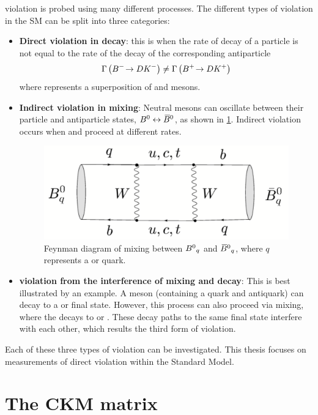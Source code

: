 \CP violation is probed using many different processes. The different types of \CP violation in the SM can be split into three categories:
\begin{itemize}
\item \textbf{Direct \CP violation in decay}: this is when the rate of decay of a particle is not equal to the rate of the decay of the corresponding antiparticle \eg
\begin{equation*}
\Gamma\left({{{B}^-}}\!\rightarrow {\ensuremath{D}}{\ensuremath{{K}^-}}\right) \neq \Gamma\left({{{B}^+}}\!\rightarrow {\ensuremath{D}}{\ensuremath{{K}^+}}\right)
\end{equation*}
where \D represents a  superposition of \Dz and \Dzb mesons.
\item \textbf{Indirect \CP violation in mixing}: Neutral mesons can oscillate between their particle and antiparticle states, ${{B}^0} \leftrightarrow {\ensuremath{{\kern 0.18em\overline{\kern -0.18em B}{}}{}^0}}$, as shown in \fig\ref{mixing}. Indirect \CP violation occurs when \decay{\Bz}{\Bzb} and \decay{\Bzb}{\Bz} proceed at different rates. 
\begin{figure}[h]
\centering
\includegraphics[width=0.5\linewidth]{figures/theory/mixing.pdf}
\caption{Feynman diagram of mixing between ${{B}^0}_q$ and ${{\kern 0.18em\overline{\kern -0.18em B}{}}{}^0}_q$, where $q$ represents a \dquark or \squark quark.}
\label{mixing}
\end{figure}
\item \textbf{\CP violation from the interference of mixing and decay}: This is best illustrated by an example. A \Bs meson (containing a \bquark quark and \squark antiquark) can decay to a \Dsm\Kp or \Dsp\Km final state. However, this process can also proceed via \decay{\Bs}{\Bsb} mixing, where the \Bsb decays to \Dsm\Kp or \Dsp\Km. These decay paths to the same final state interfere with each other, which results the third form of \CP violation.
\end{itemize} 

Each of these three types of \CP violation can be investigated. This thesis focuses on measurements of direct \CP violation within the Standard Model.

\section{The CKM matrix}

